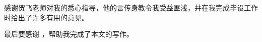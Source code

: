 \begin{ack}
  感谢贺飞老师对我的悉心指导，他的言传身教令我受益匪浅，并在我完成毕设工作时给出了许多有用的意见。

  最后要感谢 \thuthesis，帮助我完成了本文的写作。
\end{ack}